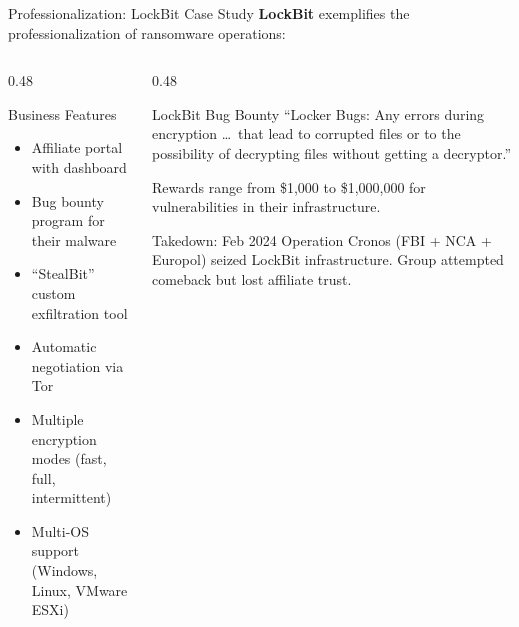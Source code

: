 \documentclass[aspectratio=169]{beamer}
\begin{document}
\begin{frame}{Professionalization: LockBit Case Study}
  \textbf{LockBit} exemplifies the professionalization of ransomware operations:

  \vspace{0.5em}
  \begin{columns}[T]
    \begin{column}{0.48\textwidth}
      \begin{block}{Business Features}
        \footnotesize
        \begin{itemize}
          \item Affiliate portal with dashboard
          \item Bug bounty program for their malware
          \item ``StealBit'' custom exfiltration tool
          \item Automatic negotiation via Tor
          \item Multiple encryption modes (fast, full, intermittent)
          \item Multi-OS support (Windows, Linux, VMware ESXi)
        \end{itemize}
      \end{block}
    \end{column}
    \begin{column}{0.48\textwidth}
      \begin{infobox}{LockBit Bug Bounty}
        ``Locker Bugs: Any errors during encryption \ldots\ that lead to corrupted files or to the possibility of decrypting files without getting a decryptor.''

        \vspace{0.3em}
        Rewards range from \$1,000 to \$1,000,000 for vulnerabilities in their infrastructure.
      \end{infobox}

      \vspace{0.3em}
      \begin{warnbox}{Takedown: Feb 2024}
        Operation Cronos (FBI + NCA + Europol) seized LockBit infrastructure. Group attempted comeback but lost affiliate trust.
      \end{warnbox}
    \end{column}
  \end{columns}
\end{frame}
\end{document}
